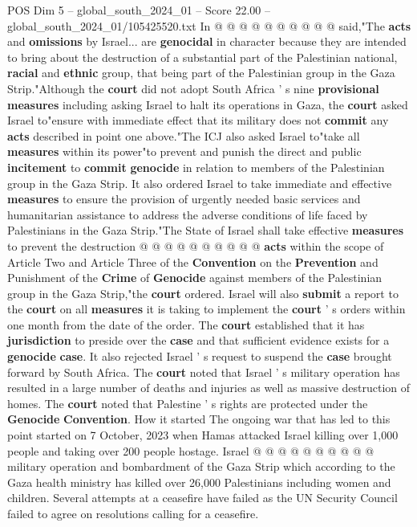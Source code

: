 \begin{textsample}{POS Dim 5 – global\_south\_2024\_01 – Score 22.00 – global\_south\_2024\_01/105425520.txt}
In @ @ @ @ @ @ @ @ @ @ said,"The \textbf{acts} and \textbf{omissions} by Israel... are \textbf{genocidal} in character because they are intended to bring about the destruction of a substantial part of the Palestinian national, \textbf{racial} and \textbf{ethnic} group, that being part of the Palestinian group in the Gaza Strip."Although the \textbf{court} did not adopt South Africa ' s nine \textbf{provisional} \textbf{measures} including asking Israel to halt its operations in Gaza, the \textbf{court} asked Israel to"ensure with immediate effect that its military does not \textbf{commit} any \textbf{acts} described in point one above."The ICJ also asked Israel to"take all \textbf{measures} within its power"to prevent and punish the direct and public \textbf{incitement} to \textbf{commit} \textbf{genocide} in relation to members of the Palestinian group in the Gaza Strip.
It also ordered Israel to take immediate and effective \textbf{measures} to ensure the provision of urgently needed basic services and humanitarian assistance to address the adverse conditions of life faced by Palestinians in the Gaza Strip."The State of Israel shall take effective \textbf{measures} to prevent the destruction @ @ @ @ @ @ @ @ @ @ \textbf{acts} within the scope of Article Two and Article Three of the \textbf{Convention} on the \textbf{Prevention} and Punishment of the \textbf{Crime} of \textbf{Genocide} against members of the Palestinian group in the Gaza Strip,"the \textbf{court} ordered.
Israel will also \textbf{submit} a report to the \textbf{court} on all \textbf{measures} it is taking to implement the \textbf{court} ' s orders within one month from the date of the order.
The \textbf{court} established that it has \textbf{jurisdiction} to preside over the \textbf{case} and that sufficient evidence exists for a \textbf{genocide} \textbf{case}.
It also rejected Israel ' s request to suspend the \textbf{case} brought forward by South Africa.
The \textbf{court} noted that Israel ' s military operation has resulted in a large number of deaths and injuries as well as massive destruction of homes.
The \textbf{court} noted that Palestine ' s rights are protected under the \textbf{Genocide} \textbf{Convention}.
How it started The ongoing war that has led to this point started on 7 October, 2023 when Hamas attacked Israel killing over 1,000 people and taking over 200 people hostage.
Israel @ @ @ @ @ @ @ @ @ @ military operation and bombardment of the Gaza Strip which according to the Gaza health ministry has killed over 26,000 Palestinians including women and children.
Several attempts at a ceasefire have failed as the UN Security Council failed to agree on resolutions calling for a ceasefire.

\end{textsample}
